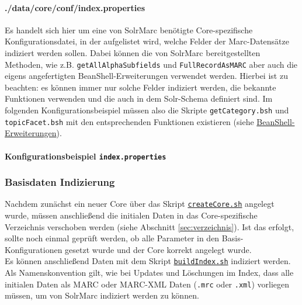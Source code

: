 \documentclass[10pt]{article}
\begin{document}
\paragraph{./data/core/conf/index.properties}
\label{para:index.properties}
Es handelt sich hier um eine von SolrMarc benötigte Core-spezifische Konfigurationsdatei, in der aufgelistet wird, welche Felder der Marc-Datensätze indiziert werden sollen. Dabei können die von SolrMarc bereitgestellten Methoden, wie z.B. \texttt{getAllAlphaSubfields} und \texttt{FullRecordAsMARC} aber auch die eigens angefertigten BeanShell-Erweiterungen verwendet werden. Hierbei ist zu beachten: es können immer nur solche Felder indiziert werden, die bekannte Funktionen verwenden und die auch in dem Solr-Schema definiert sind. Im folgenden Konfigurationsbeispiel müssen also die Skripte \texttt{getCategory.bsh} und \texttt{topicFacet.bsh} mit den entsprechenden Funktionen existieren (siehe \hyperref[para:beanShell]{BeanShell-Erweiterungen}). \\ \\
\textbf{Konfigurationsbeispiel \texttt{index.properties}} 


\subsubsection{Basisdaten Indizierung}
\label{sec:subsub:Basis}
Nachdem zunächst ein neuer Core über das Skript \hyperref[sec:para:createCore]{\texttt{createCore.sh}} angelegt wurde, müssen anschließend die initialen Daten in das Core-spezifische Verzeichnis verschoben werden (siehe Abschnitt \ref{sec:verzeichnis}). Ist das erfolgt, sollte noch einmal geprüft werden, ob alle Parameter in den Basis-Konfigurationen gesetzt wurde und der Core korrekt angelegt wurde. \\
Es können anschließend Daten mit dem Skript \hyperref[sec:para:buildIndex]{\texttt{buildIndex.sh}} indiziert werden. Als Namenskonvention gilt, wie bei Updates und Löschungen im Index, dass alle initialen Daten als MARC oder MARC-XML Daten (\texttt{.mrc} oder \texttt{.xml}) vorliegen müssen, um von SolrMarc indiziert werden zu können. 
\end{document}

